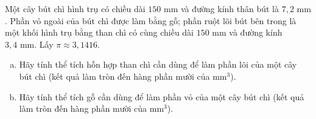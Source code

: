 \begin{bt}%
Một cây bút chì hình trụ có chiều dài $150\text{ mm}$ và đường kính thân bút là $7{,}2\text{ mm}$. Phần vỏ ngoài của bút chì được làm bằng gỗ; phần ruột lõi bút bên trong là một khối hình trụ bằng than chì có cùng chiều dài $150\text{ mm}$ và đường kính $3{,}4\text{ mm}$. Lấy $\pi \approx 3{,}1416$.
\begin{enumerate}[a)]
    \item Hãy tính thể tích hỗn hợp than chì cần dùng để làm phần lõi của một cây bút chì (kết quả làm tròn đến hàng phần mười của $\text{mm}^3$).
    \item Hãy tính thể tích gỗ cần dùng để làm phần vỏ của một cây bút chì (kết quả làm tròn đến hàng phần mười của $\text{mm}^3$).
\end{enumerate}
\end{bt}

